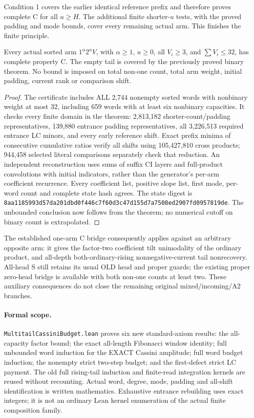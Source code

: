 Condition 1 covers the earlier identical reference prefix and
therefore proves complete C for all $u\ge H$. The additional
finite shorter-$u$ tests, with the proved padding and mode bounds,
cover every remaining actual arm. This finishes the finite principle.

\begin{corollary}
Every actual sorted arm $1^\alpha2^uV$, with $\alpha\ge1$, $u\ge0$,
all $V_i\ge3$, and $\sum V_i\le32$, has complete property C.
The empty tail is covered by the previously proved binary theorem.
No bound is imposed on total non-one count, total arm weight,
initial padding, current rank or comparison shift.
\end{corollary}
\begin{proof}
The certificate includes ALL 2,744 nonempty sorted words with
nonbinary weight at most 32, including 659 words with at least six
nonbinary capacities. It checks every finite domain in the theorem:
2,813,182 shorter-count/padding representatives, 139,880 entrance
padding representatives, all 3,226,513 required entrance LC minors,
and every early reference shift. Exact prefix minima of consecutive
cumulative ratios verify all shifts using 105,427,810 cross products;
944,458 selected literal comparisons separately check that reduction.
An independent reconstruction uses sums of suffix CI layers and
full-product convolutions with initial indicators, rather than the
generator's per-arm coefficient recurrence. Every coefficient list,
positive slope list, first mode, per-word count and complete state
hash agrees. The state digest is
\texttt{8aa1185993d57da201dbd0f446c7f60d3c47d155d7a7508ed2907fd0957819de}.
The unbounded conclusion now follows from the theorem; no numerical
cutoff on binary count is extrapolated.
\end{proof}

The established one-arm C bridge consequently applies against an
arbitrary opposite arm: it gives the factor-two coefficient tilt
unimodality of the ordinary product, and all-depth both-ordinary-rising
nonnegative-current tail nonrecovery. All-head S still retains its
usual OLD head and proper guards; the existing proper zero-head
bridge is available with both non-one counts at least two.
These auxiliary consequences do not close the remaining original
mixed/incoming/A2 branches.

\paragraph{Formal scope.}
\texttt{MultitailCassiniBudget.lean} proves six new standard-axiom
results: the all-capacity factor bound; the exact all-length Fibonacci
window identity; full unbounded word induction for the EXACT Cassini
amplitude; full word budget induction; the nonempty strict two-step
budget; and the first-defect strict LC payment. The old full
rising-tail induction and finite-read integration kernels are reused
without recounting. Actual word, degree, mode, padding and all-shift
identification is written mathematics. Exhaustive entrance rebuilding
uses exact integers; it is not an ordinary Lean kernel enumeration
of the actual finite composition family.

